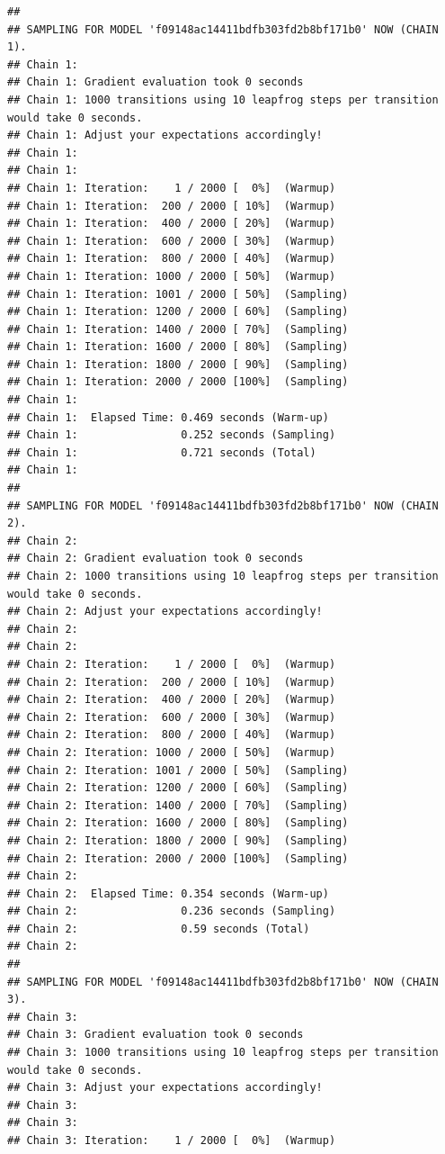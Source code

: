 \documentclass[]{article}
\begin{document}
\begin{verbatim}
## 
## SAMPLING FOR MODEL 'f09148ac14411bdfb303fd2b8bf171b0' NOW (CHAIN 1).
## Chain 1: 
## Chain 1: Gradient evaluation took 0 seconds
## Chain 1: 1000 transitions using 10 leapfrog steps per transition would take 0 seconds.
## Chain 1: Adjust your expectations accordingly!
## Chain 1: 
## Chain 1: 
## Chain 1: Iteration:    1 / 2000 [  0%]  (Warmup)
## Chain 1: Iteration:  200 / 2000 [ 10%]  (Warmup)
## Chain 1: Iteration:  400 / 2000 [ 20%]  (Warmup)
## Chain 1: Iteration:  600 / 2000 [ 30%]  (Warmup)
## Chain 1: Iteration:  800 / 2000 [ 40%]  (Warmup)
## Chain 1: Iteration: 1000 / 2000 [ 50%]  (Warmup)
## Chain 1: Iteration: 1001 / 2000 [ 50%]  (Sampling)
## Chain 1: Iteration: 1200 / 2000 [ 60%]  (Sampling)
## Chain 1: Iteration: 1400 / 2000 [ 70%]  (Sampling)
## Chain 1: Iteration: 1600 / 2000 [ 80%]  (Sampling)
## Chain 1: Iteration: 1800 / 2000 [ 90%]  (Sampling)
## Chain 1: Iteration: 2000 / 2000 [100%]  (Sampling)
## Chain 1: 
## Chain 1:  Elapsed Time: 0.469 seconds (Warm-up)
## Chain 1:                0.252 seconds (Sampling)
## Chain 1:                0.721 seconds (Total)
## Chain 1: 
## 
## SAMPLING FOR MODEL 'f09148ac14411bdfb303fd2b8bf171b0' NOW (CHAIN 2).
## Chain 2: 
## Chain 2: Gradient evaluation took 0 seconds
## Chain 2: 1000 transitions using 10 leapfrog steps per transition would take 0 seconds.
## Chain 2: Adjust your expectations accordingly!
## Chain 2: 
## Chain 2: 
## Chain 2: Iteration:    1 / 2000 [  0%]  (Warmup)
## Chain 2: Iteration:  200 / 2000 [ 10%]  (Warmup)
## Chain 2: Iteration:  400 / 2000 [ 20%]  (Warmup)
## Chain 2: Iteration:  600 / 2000 [ 30%]  (Warmup)
## Chain 2: Iteration:  800 / 2000 [ 40%]  (Warmup)
## Chain 2: Iteration: 1000 / 2000 [ 50%]  (Warmup)
## Chain 2: Iteration: 1001 / 2000 [ 50%]  (Sampling)
## Chain 2: Iteration: 1200 / 2000 [ 60%]  (Sampling)
## Chain 2: Iteration: 1400 / 2000 [ 70%]  (Sampling)
## Chain 2: Iteration: 1600 / 2000 [ 80%]  (Sampling)
## Chain 2: Iteration: 1800 / 2000 [ 90%]  (Sampling)
## Chain 2: Iteration: 2000 / 2000 [100%]  (Sampling)
## Chain 2: 
## Chain 2:  Elapsed Time: 0.354 seconds (Warm-up)
## Chain 2:                0.236 seconds (Sampling)
## Chain 2:                0.59 seconds (Total)
## Chain 2: 
## 
## SAMPLING FOR MODEL 'f09148ac14411bdfb303fd2b8bf171b0' NOW (CHAIN 3).
## Chain 3: 
## Chain 3: Gradient evaluation took 0 seconds
## Chain 3: 1000 transitions using 10 leapfrog steps per transition would take 0 seconds.
## Chain 3: Adjust your expectations accordingly!
## Chain 3: 
## Chain 3: 
## Chain 3: Iteration:    1 / 2000 [  0%]  (Warmup)

\end{verbatim}
\end{document}
